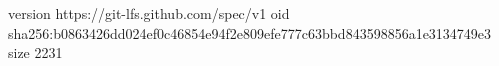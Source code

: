 version https://git-lfs.github.com/spec/v1
oid sha256:b0863426dd024ef0c46854e94f2e809efe777c63bbd843598856a1e3134749e3
size 2231
